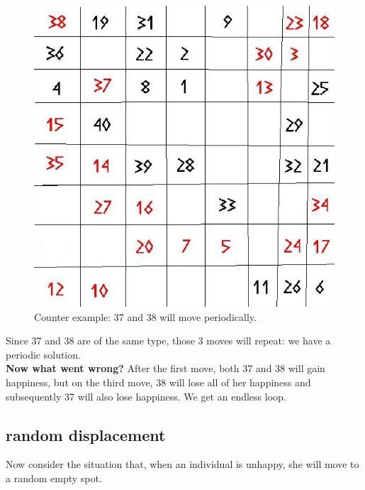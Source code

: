 \documentclass{article}
\begin{document}
\begin{figure}[!ht]
\begin{center}
\includegraphics[scale=0.25]{segregation_tegenvb_3.jpg}
\end{center}
\caption{Counter example: 37 and 38 will move periodically.}\label{counterexample3}
\end{figure}
Since 37 and 38 are of the same type, those 3 moves will repeat: we have a periodic solution.\\
\textbf{Now what went wrong?} After the first move, both 37 and 38 will gain happiness, but on the third move, 38 will lose all of her happiness and subsequently 37 will also lose happiness. We get an endless loop.\\
\subsection{random displacement}
Now consider the situation that, when an individual is unhappy, she will move to a random empty spot.
\end{document}
